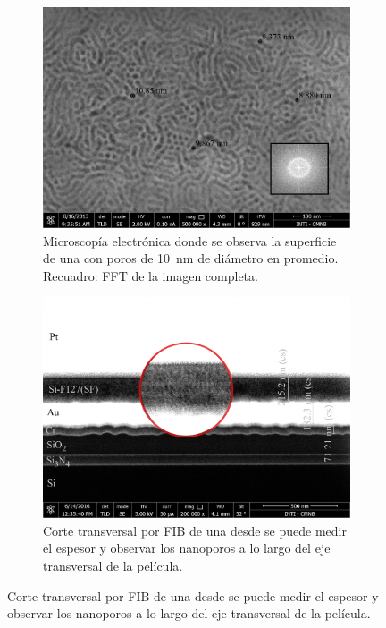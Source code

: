 				\begin{figure}[bh!]
		 	   	    \begin{subfigure}[t]{0.495\textwidth}
			        	\includegraphics[width=\textwidth]{Imagenes/Superficie-F127-medidas.jpg}
			       		\caption{Microscopía electrónica donde se observa la superficie de una \pdmF\space con poros de \SI{10}{nm} de diámetro en promedio. Recuadro: FFT de la imagen completa.}
			       		\label{fig:sem_homogeneidad1}
			       		\end{subfigure}
					\begin{subfigure}[t]{0.495\textwidth}
			 	   	    \includegraphics[width=\textwidth]{Imagenes/Perfil-F127.jpg}
			       		\caption{Corte transversal por FIB de una \pdmF\space desde se puede medir el espesor y observar los nanoporos a lo largo del eje transversal de la película.}

\end{subfigure}
\end{figure}
